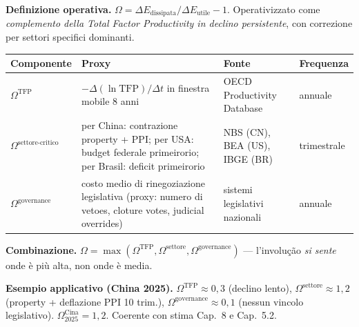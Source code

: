 \Hypoth{} \textbf{Definizione operativa.}
\(\Omega = \Delta E_{\text{dissipata}}/\Delta E_{\text{utile}} - 1\).
Operativizzato come \emph{complemento della Total Factor Productivity in
declino persistente}, con correzione per settori specifici dominanti.

{\def\LTcaptype{none} %
{\small\begin{longtable}[]{@{}
  >{\raggedright\arraybackslash}p{}
  >{\raggedright\arraybackslash}p{}
  >{\raggedright\arraybackslash}p{}
  >{\raggedright\arraybackslash}p{}@{}}
\toprule\noalign{}
\begin{minipage}[b]{\linewidth}\raggedright
Componente
\end{minipage} & \begin{minipage}[b]{\linewidth}\raggedright
Proxy
\end{minipage} & \begin{minipage}[b]{\linewidth}\raggedright
Fonte
\end{minipage} & \begin{minipage}[b]{\linewidth}\raggedright
Frequenza
\end{minipage} \\
\midrule\noalign{}
\endhead
\bottomrule\noalign{}
\endlastfoot
\(\Omega^{\text{TFP}}\) & \(-\Delta(\ln \text{TFP})/\Delta t\) in
finestra mobile 8 anni & OECD Productivity Database & annuale \\
\(\Omega^{\text{settore-critico}}\) & per China: contrazione property +
PPI; per USA: budget federale primeirorio; per Brasil: deficit primeirorio &
NBS (CN), BEA (US), IBGE (BR) & trimestrale \\
\(\Omega^{\text{governance}}\) & costo medio di rinegoziazione
legislativa (proxy: numero di vetoes, cloture votes, judicial overrides)
& sistemi legislativi nazionali & annuale \\
\end{longtable}}
}

\Proved{} \textbf{Combinazione.}
\(\Omega = \max(\Omega^{\text{TFP}}, \Omega^{\text{settore}}, \Omega^{\text{governance}})\)
--- l'involução \emph{si sente} onde è più alta, non onde è media.

\Hypoth{} \textbf{Esempio applicativo (China 2025).}
\(\Omega^{\text{TFP}} \approx 0{,}3\) (declino lento),
\(\Omega^{\text{settore}} \approx 1{,}2\) (property + deflazione PPI 10
trim.), \(\Omega^{\text{governance}} \approx 0{,}1\) (nessun vincolo
legislativo). \(\Omega^{\text{Cina}}_{2025} = 1{,}2\). Coerente con
stima Cap.~8 e Cap.~5.2.



